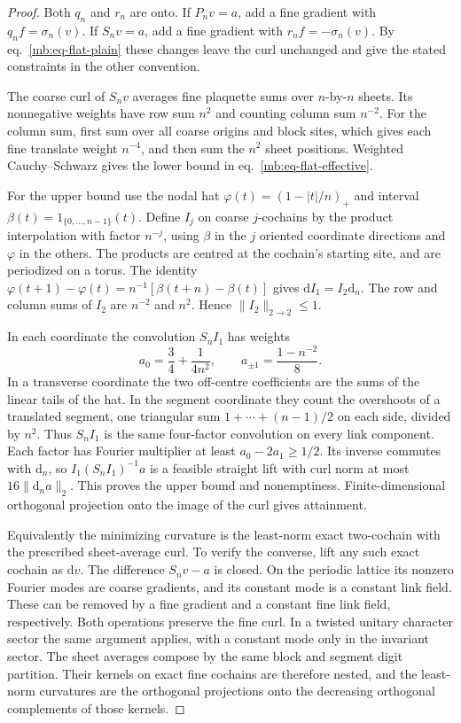 \documentclass[11pt,letterpaper,reqno]{amsart}
\numberwithin{equation}{section}
\renewcommand{\eqref}[1]{\textup{eq.~\ref{#1}}}
\theoremstyle{definition}
\theoremstyle{remark}
\begin{document}
\begin{proof}
Both \(q_n\) and \(r_n\) are onto. If \(P_nv=a\), add a fine
gradient with \(q_nf=\sigma_n(v)\). If \(S_nv=a\), add a fine
gradient with \(r_nf=-\sigma_n(v)\). By \eqref{mb:eq-flat-plain}
these changes leave the curl unchanged and give the stated
constraints in the other convention.

The coarse curl of \(S_nv\) averages fine plaquette sums over
\(n\)-by-\(n\) sheets. Its nonnegative weights have row sum
\(n^2\) and counting column sum \(n^{-2}\). For the column sum,
first sum over all coarse origins and block sites, which gives
each fine translate weight \(n^{-4}\), and then sum the \(n^2\)
sheet positions. Weighted Cauchy--Schwarz gives the lower bound
in \eqref{mb:eq-flat-effective}.

For the upper bound use the nodal hat
\(\varphi(t)=(1-|t|/n)_+\) and interval
\(\beta(t)=1_{\{0,\ldots,n-1\}}(t)\). Define \(I_j\) on coarse
\(j\)-cochains by the product interpolation with factor \(n^{-j}\),
using \(\beta\) in the \(j\) oriented coordinate directions and
\(\varphi\) in the others. The products are centred at the
cochain's starting site, and are periodized on a torus.
The identity
\(\varphi(t+1)-\varphi(t)=n^{-1}[\beta(t+n)-\beta(t)]\)
gives \(\mathrm d I_1=I_2\mathrm d_n\). The row and column
sums of \(I_2\) are \(n^{-2}\) and \(n^2\). Hence
\(\|I_2\|_{2\to2}\le1\).

In each coordinate the convolution \(S_n I_1\) has weights
\[
 a_0=\frac34+\frac1{4n^2},\qquad
 a_{\pm1}=\frac{1-n^{-2}}8 .
\]
In a transverse coordinate the two off-centre coefficients
are the sums of the linear tails of the hat. In the segment
coordinate they count the overshoots of a translated segment,
one triangular sum \(1+\cdots+(n-1)/2\) on each side, divided
by \(n^2\). Thus \(S_n I_1\) is the same four-factor convolution
on every link component. Each factor has Fourier multiplier
at least \(a_0-2a_1\ge1/2\). Its inverse commutes with
\(\mathrm d_n\), so \(I_1(S_n I_1)^{-1}a\) is a feasible
straight lift with curl norm at most \(16\|\mathrm d_na\|_2\).
This proves the upper bound and nonemptiness. Finite-dimensional
orthogonal projection onto the image of the curl gives attainment.

Equivalently the minimizing curvature is the least-norm exact
two-cochain with the prescribed sheet-average curl. To verify the
converse, lift any such exact cochain as \(\mathrm dv\). The
difference \(S_nv-a\) is closed. On the periodic lattice its
nonzero Fourier modes are coarse gradients, and its constant mode
is a constant link field. These can be removed by a fine gradient
and a constant fine link field, respectively. Both operations
preserve the fine curl. In a twisted unitary character sector the
same argument applies, with a constant mode only in the invariant
sector. The sheet averages compose by the same block and segment
digit partition. Their kernels on exact fine cochains are therefore
nested, and the least-norm curvatures are the orthogonal projections
onto the decreasing orthogonal complements of those kernels.


\end{proof}
\end{document}
